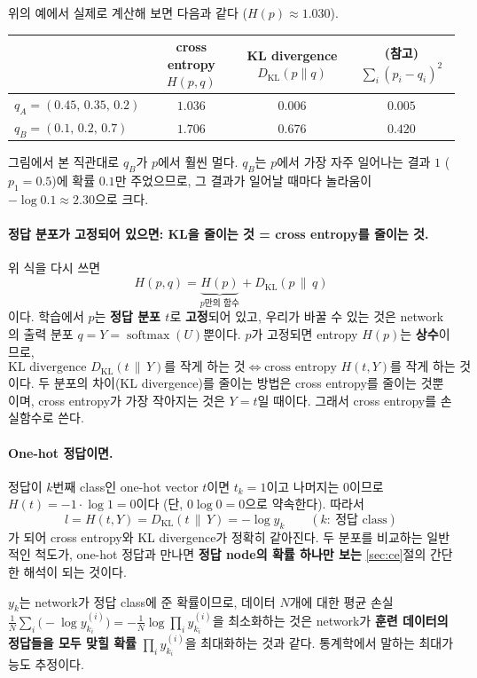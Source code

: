\documentclass[11pt,a4paper]{article}
\newcommand{\softmax}{\operatorname{softmax}}
\begin{document}
위의 예에서 실제로 계산해 보면 다음과 같다 ($H(p)\approx1.030$).

\begin{center}
\begin{tabular}{@{}lccc@{}}
\toprule
& cross entropy $H(p,q)$ & KL divergence $D_{\mathrm{KL}}(p\|q)$ & (참고) $\sum_i(p_i-q_i)^2$ \\
\midrule
$q_A=(0.45,\,0.35,\,0.2)$ & $1.036$ & $0.006$ & $0.005$ \\
$q_B=(0.1,\,0.2,\,0.7)$ & $1.706$ & $0.676$ & $0.420$ \\
\bottomrule
\end{tabular}
\end{center}

그림에서 본 직관대로 $q_B$가 $p$에서 훨씬 멀다.
$q_B$는 $p$에서 가장 자주 일어나는 결과 $1$ ($p_1=0.5$)에 확률 $0.1$만 주었으므로,
그 결과가 일어날 때마다 놀라움이 $-\log0.1\approx2.30$으로 크다.

\paragraph{정답 분포가 고정되어 있으면: KL을 줄이는 것 = cross entropy를 줄이는 것.}
위 식을 다시 쓰면
\[
H(p,q)=\underbrace{H(p)}_{p\text{만의 함수}}+D_{\mathrm{KL}}(p\,\|\,q)
\]
이다. 학습에서 $p$는 \textbf{정답 분포 $t$}로 \textbf{고정}되어 있고,
우리가 바꿀 수 있는 것은 network의 출력 분포 $q=Y=\softmax(U)$뿐이다.
$p$가 고정되면 entropy $H(p)$는 \textbf{상수}이므로,
\[
\text{KL divergence } D_{\mathrm{KL}}(t\,\|\,Y)\text{를 작게 하는 것}
\iff
\text{cross entropy } H(t,Y)\text{를 작게 하는 것}
\]
이다. 두 분포의 차이(KL divergence)를 줄이는 방법은 cross entropy를 줄이는 것뿐이며,
cross entropy가 가장 작아지는 것은 $Y=t$일 때이다.
그래서 cross entropy를 손실함수로 쓴다.

\paragraph{One-hot 정답이면.}
정답이 $k$번째 class인 one-hot vector $t$이면 $t_k=1$이고 나머지는 $0$이므로
$H(t)=-1\cdot\log1=0$이다 (단, $0\log0=0$으로 약속한다). 따라서
\[
l=H(t,Y)=D_{\mathrm{KL}}(t\,\|\,Y)=-\log y_k
\qquad(k:\ \text{정답 class})
\]
가 되어 cross entropy와 KL divergence가 정확히 같아진다.
두 분포를 비교하는 일반적인 척도가, one-hot 정답과 만나면
\textbf{정답 node의 확률 하나만 보는} \ref{sec:ce}절의 간단한 해석이 되는 것이다.

\begin{remarkbox}
$y_k$는 network가 정답 class에 준 확률이므로,
데이터 $N$개에 대한 평균 손실
$\frac1N\sum_{i}\bigl(-\log y^{(i)}_{k_i}\bigr)=-\frac1N\log\prod_{i}y^{(i)}_{k_i}$을 최소화하는 것은
network가 \textbf{훈련 데이터의 정답들을 모두 맞힐 확률} $\prod_i y^{(i)}_{k_i}$을 최대화하는 것과 같다.
통계학에서 말하는 최대가능도 추정이다.
\end{remarkbox}
\end{document}
